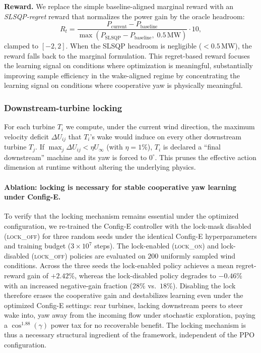\documentclass[final,5p,times]{elsarticle}
\begin{document}
\textbf{Reward.} We replace the simple baseline-aligned marginal reward with an \emph{SLSQP-regret} reward that normalizes the power gain by the oracle headroom:
\begin{equation}
R_t=\frac{P_\mathrm{current}-P_\mathrm{baseline}}{\max(P_\mathrm{SLSQP}-P_\mathrm{baseline},\;0.5\,\mathrm{MW})}\cdot 10,
\label{eq:reward}
\end{equation}
clamped to $[-2,2]$. When the SLSQP headroom is negligible ($<0.5$\,MW), the reward falls back to the marginal formulation. This regret-based reward focuses the learning signal on conditions where optimization is meaningful, substantially improving sample efficiency in the wake-aligned regime by concentrating the learning signal on conditions where cooperative yaw is physically meaningful.

\subsubsection{Downstream-turbine locking}\label{sec:downstream_lock}

For each turbine $T_i$ we compute, under the current wind direction, the maximum velocity deficit $\Delta U_{ij}$ that $T_i$'s wake would induce on every other downstream turbine $T_j$. If $\max_j \Delta U_{ij}<\eta U_\infty$ (with $\eta=1\%$), $T_i$ is declared a ``final downstream'' machine and its yaw is forced to $0^\circ$. This prunes the effective action dimension at runtime without altering the underlying physics.

\paragraph{Ablation: locking is necessary for stable cooperative yaw learning under Config-E.} To verify that the locking mechanism remains essential under the optimized configuration, we re-trained the Config-E controller with the lock-mask disabled (\textsc{lock\_off}) for three random seeds under the identical Config-E hyperparameters and training budget ($3{\times}10^{7}$ steps). The lock-enabled (\textsc{lock\_on}) and lock-disabled (\textsc{lock\_off}) policies are evaluated on $200$ uniformly sampled wind conditions. Across the three seeds the lock-enabled policy achieves a mean regret-reward gain of $\mathbf{+2.42\%}$, whereas the lock-disabled policy degrades to $\mathbf{-0.46\%}$ with an increased negative-gain fraction ($28\%$ vs.\ $18\%$). Disabling the lock therefore erases the cooperative gain and destabilizes learning even under the optimized Config-E settings: rear turbines, lacking downstream peers to steer wake into, yaw away from the incoming flow under stochastic exploration, paying a $\cos^{1.88}(\gamma)$ power tax for no recoverable benefit. The locking mechanism is thus a necessary structural ingredient of the framework, independent of the PPO configuration.
\end{document}
